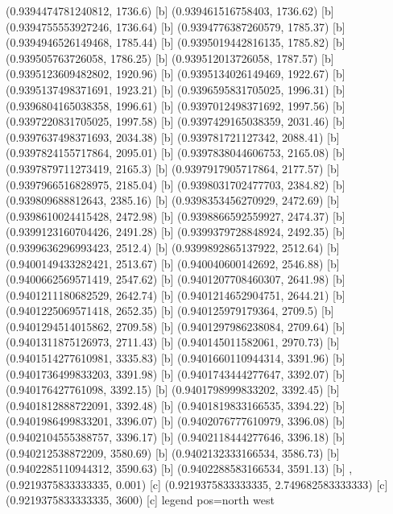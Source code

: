{{{(0.9394474781240812, 1736.6) [b] 
(0.939461516758403, 1736.62) [b] 
(0.9394755553927246, 1736.64) [b] 
(0.9394776387260579, 1785.37) [b] 
(0.9394946526149468, 1785.44) [b] 
(0.9395019442816135, 1785.82) [b] 
(0.939505763726058, 1786.25) [b] 
(0.939512013726058, 1787.57) [b] 
(0.9395123609482802, 1920.96) [b] 
(0.9395134026149469, 1922.67) [b] 
(0.9395137498371691, 1923.21) [b] 
(0.9396595831705025, 1996.31) [b] 
(0.9396804165038358, 1996.61) [b] 
(0.9397012498371692, 1997.56) [b] 
(0.9397220831705025, 1997.58) [b] 
(0.9397429165038359, 2031.46) [b] 
(0.9397637498371693, 2034.38) [b] 
(0.939781721127342, 2088.41) [b] 
(0.9397824155717864, 2095.01) [b] 
(0.9397838044606753, 2165.08) [b] 
(0.9397879711273419, 2165.3) [b] 
(0.9397917905717864, 2177.57) [b] 
(0.9397966516828975, 2185.04) [b] 
(0.9398031702477703, 2384.82) [b] 
(0.939809688812643, 2385.16) [b] 
(0.9398353456270929, 2472.69) [b] 
(0.9398610024415428, 2472.98) [b] 
(0.9398866592559927, 2474.37) [b] 
(0.9399123160704426, 2491.28) [b] 
(0.9399379728848924, 2492.35) [b] 
(0.9399636296993423, 2512.4) [b] 
(0.9399892865137922, 2512.64) [b] 
(0.9400149433282421, 2513.67) [b] 
(0.940040600142692, 2546.88) [b] 
(0.9400662569571419, 2547.62) [b] 
(0.9401207708460307, 2641.98) [b] 
(0.9401211180682529, 2642.74) [b] 
(0.9401214652904751, 2644.21) [b] 
(0.9401225069571418, 2652.35) [b] 
(0.940125979179364, 2709.5) [b] 
(0.9401294514015862, 2709.58) [b] 
(0.9401297986238084, 2709.64) [b] 
(0.9401311875126973, 2711.43) [b] 
(0.940145011582061, 2970.73) [b] 
(0.9401514277610981, 3335.83) [b] 
(0.9401660110944314, 3391.96) [b] 
(0.9401736499833203, 3391.98) [b] 
(0.9401743444277647, 3392.07) [b] 
(0.940176427761098, 3392.15) [b] 
(0.9401798999833202, 3392.45) [b] 
(0.9401812888722091, 3392.48) [b] 
(0.9401819833166535, 3394.22) [b] 
(0.9401986499833201, 3396.07) [b] 
(0.9402076777610979, 3396.08) [b] 
(0.9402104555388757, 3396.17) [b] 
(0.9402118444277646, 3396.18) [b] 
(0.940212538872209, 3580.69) [b] 
(0.9402132333166534, 3586.73) [b] 
(0.9402285110944312, 3590.63) [b] 
(0.9402288583166534, 3591.13) [b] 
},{(0.9219375833333335, 0.001) [c] 
(0.9219375833333335, 2.749682583333333) [c] 
(0.9219375833333335, 3600) [c] 
}}}{legend pos=north west}